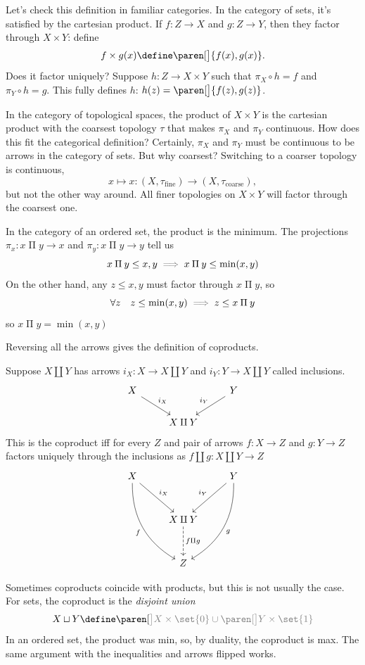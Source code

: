 \documentclass[a5paper]{scrartcl}
\newcommand{\PI}{\mathbin{\Pi}}
\let\oldimplies\implies
\def\implies{\color{gray}\oldimplies\color{black}}
\begin{document}
Let's check this definition in familiar categories. In the category of sets, it's satisfied by the cartesian product. If \(f: Z \to X\) and \(g: Z \to Y\), then they factor through \(X\times Y\): define
\[
  f\times g (x) \define \paren[\big]{f(x),g(x)}.
\]
Does it factor uniquely? Suppose \(h: Z \to X\times Y\) such that \(\pi_X\circ h = f\) and \(\pi_Y \circ h = g\). This fully defines \(h\): \(h(z) = \paren[\big]{f(z),g(z)} \).

In the category of topological spaces, the product of \(X\times Y\) is the cartesian product with the coarsest topology \(\tau\) that makes \(\pi_X\) and \(\pi_Y\) continuous. How does this fit the categorical definition? Certainly, \(\pi_X\) and \(\pi_Y\) must be continuous to be arrows in the category of sets. But why coarsest? Switching to a coarser topology is continuous,
\[ x \mapsto x: (X, \tau_{\text{fine}}) \to (X, \tau_{\text{coarse}}),\]
 but not the other way around. All finer topologies on \(X\times Y\) will factor through the coarsest one.

 In the category of an ordered set, the product is the minimum. The projections \(\pi_x : x \PI y \to x\)  and \(\pi_y: x \PI y \to y\) tell us
 \[
  x \PI y \leq x,y \implies x \PI y \leq \min(x,y)
 \]
 On the other hand, any \(z\leq x,y\) must factor through \(x\PI y\), so
 \[
   \forall z \quad  z \leq \min(x,y)\implies z\leq x \PI y
 \]
 so \(x \PI y = \min(x,y)\)


Reversing all the arrows gives the definition of coproducts.
\begin{defn}[Coproduct]
  Suppose \(X\amalg Y\) has arrows \(i_X: X\to X\amalg Y\) and \(i_Y :Y \to X\amalg Y\) called inclusions.
  \[
    \begin{tikzcd}
      X\ar["i_X"]{dr} && Y\ar[swap,"i_Y"]{dl} \\
      & X\amalg Y
    \end{tikzcd}
  \]
  This is the coproduct iff for every \(Z\) and pair of arrows \(f: X \to Z\) and \(g: Y \to Z\) factors uniquely through the inclusions as \(f\amalg g: X\amalg Y \to Z\)
  \[
    \begin{tikzcd}[row sep=3em]
      X\ar[bend right=3em,swap,"f"]{ddr}\ar["i_X"]{dr} && Y\ar[bend left=3em,"g"]{ddl}\ar["i_Y",swap]{dl} \\
      &X \amalg Y \dar[dashed]{f\amalg g}\\
      &Z
    \end{tikzcd}
  \]
\end{defn}
Sometimes coproducts coincide with products, but this is not usually the case. For sets, the coproduct is the \emph{disjoint union}
\[
  X\sqcup Y \define \paren[\color{gray}\big]{X\times \set{0}} \cup \paren[\color{gray}\big]{Y \times \set {1}}
\]
In an ordered set, the product was min, so, by duality, the coproduct is max. The same argument with the inequalities and arrows flipped works.
\end{document}
